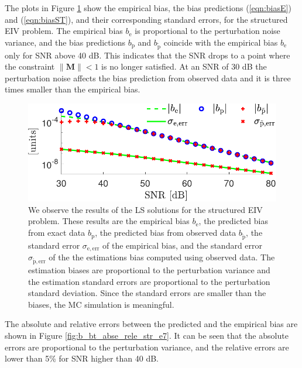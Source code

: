 The plots \color{blue} in \color{black} Figure \ref{fig:bias_sigma_NMC_str_str_n2} show the empirical bias, the bias predictions (\ref{eqn:biasE}) and (\ref{eqn:biasST}), and their corresponding standard errors, for the structured EIV problem.
The empirical bias $b_\mathrm{e}$ is proportional to the perturbation noise variance, and
the bias predictions $b_\mathrm{p}$ and $b_{\widetilde{\mathrm{p}}}$ coincide with the empirical bias $b_\mathrm{e}$ only for SNR above 40 dB.
This indicates that the SNR drops to a point where the constraint $\| \mathbf{M} \| < 1$ is no longer satisfied.
At an SNR of 30 dB the perturbation noise affects the bias prediction from observed data and it is three times smaller than the empirical bias.

\begin{figure}[htb!]
 \centering
 \includegraphics[width=0.69\columnwidth]{./ChapterStatisticalAnalysis/fig/Fig_7.pdf} 
  \caption{ \label{fig:bias_sigma_NMC_str_str_n2} 
  We observe the results of the LS solutions \color{blue} for the structured EIV problem\color{black}. These results are the empirical bias $b_{\mathrm{e}}$, the predicted bias from exact data $b_{\mathrm{p}}$, the predicted bias from observed data $b_{\widetilde{\mathrm{p}}}$, the standard error $\sigma_{\mathrm{e,err}}$ of the empirical bias, and the standard error $\sigma_{\widetilde{\mathrm{p}} \mathrm{,err}}$ of the the estimations bias computed using observed data. The estimation biases are proportional to the perturbation variance and the estimation standard errors are proportional to the perturbation standard deviation. Since the standard errors are smaller than the biases, the MC simulation is meaningful. }
\end{figure}

The absolute and relative errors between the predicted and the empirical bias are shown in Figure \ref{fig:b_bt_abse_rele_str_e7}.
It can be seen that the absolute errors are proportional to the perturbation variance, and the relative errors are lower than 5\% for SNR higher than 40 dB. 


